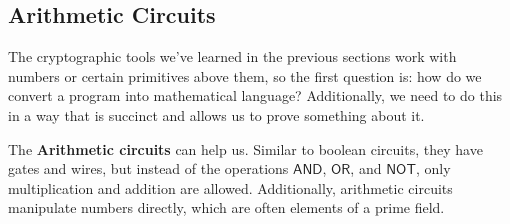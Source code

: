 \documentclass[../lecture-notes.tex]{subfiles}
\begin{document}
\subsection{Arithmetic Circuits}
The cryptographic tools we've learned in the previous sections work with numbers or certain 
primitives above them, so the first question is: how do we convert a program into mathematical 
language? Additionally, we need to do this in a way that is succinct and allows us to prove 
something about it.

The \textbf{Arithmetic circuits} can help us. Similar to boolean circuits, they have gates and 
wires, but instead of the operations $\mathsf{AND}$, $\mathsf{OR}$, and $\mathsf{NOT}$, only 
multiplication and addition are allowed. Additionally, arithmetic circuits manipulate numbers 
directly, which are often elements of a prime field.



\end{document}
